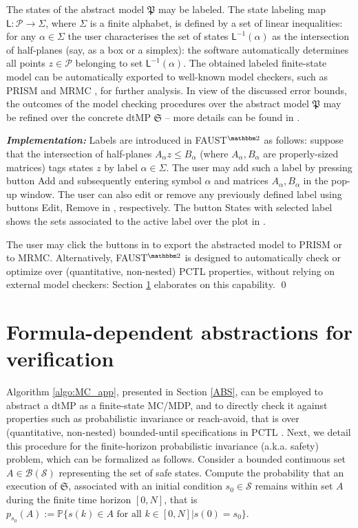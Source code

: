 \documentclass{llncs}
\newcommand*\circledb[1]{\tikz[baseline=(char.base)]{\node[shape=circle,draw,inner sep=0.2pt] (char) {#1};}}
\newcommand{\software}{\textsf{FAUST}$^{\mathbbm 2}$\xspace}
\newcommand{\boxname}[1]{\textsf{#1}}
\begin{document}
The states of the abstract model $\mathfrak P$ may be labeled. 
The state labeling map $\mathsf L:\mathcal P\rightarrow \Sigma$, 
where $\Sigma$ is a finite alphabet, 
is defined by a set of linear inequalities:  
for any $\alpha\in\Sigma$ the user characterises the set of states $\mathsf L^{-1}(\alpha)$ as the intersection of half-planes (say, as a box or a simplex):  
the software automatically determines all points $z\in\mathcal P$ belonging to set $\mathsf L^{-1}(\alpha)$.   
The obtained labeled finite-state model
can be automatically exported to well-known model checkers, 
such as PRISM and MRMC \cite{HKNP06,KKZ05}, 
for further analysis.   
In view of the discussed error bounds, 
the outcomes of the model checking procedures over the abstract model $\mathfrak P$ may be refined over the concrete dtMP $\mathfrak S$ -- 
more details can be found in \cite{APKL10,TA13}. 

\textit{\textbf{Implementation: }}
Labels are introduced in \software as follows: 
suppose that the intersection of half-planes $A_{\alpha}z\le B_{\alpha}$ (where $A_{\alpha},B_{\alpha}$ are properly-sized matrices) tags states $z$ by label $\alpha\in\Sigma$. 
The user may add such a label
by pressing button \boxname{Add} \circledb{10} and subsequently entering symbol $\alpha$ and matrices $A_{\alpha},B_{\alpha}$ in the pop-up window.
The user can also edit or remove any previously defined label using buttons \boxname{Edit, Remove} in \circledb{10}, respectively. 
The button \boxname{States with selected label} \circledb{10} shows the sets associated to the active label over the plot in \circledb{13} . 

The user may click the buttons in \circledb{11} to export the abstracted model to PRISM or to MRMC. 
Alternatively, \software is designed to automatically check or optimize over (quantitative, non-nested) PCTL properties, 
without relying on external model checkers: Section \ref{PCTL} elaborates on this capability. 
\qed

\vspace{-0.1in}
\section{Formula-dependent abstractions for verification}
\label{PCTL}

Algorithm \ref{algo:MC_app}, presented in Section \ref{ABS}, 
can be employed to abstract a dtMP as a finite-state MC/MDP, 
and to directly check it against properties such as probabilistic invariance or reach-avoid, 
that is over (quantitative, non-nested) bounded-until specifications in PCTL \cite{HJ94}. 
Next, we detail this procedure for the finite-horizon probabilistic invariance (a.k.a. safety) problem, 
which can be formalized as follows. 
Consider a bounded continuous set $A \in \mathcal B(\mathcal S)$ representing the set of safe states.
Compute the probability that an execution of $\mathfrak S$, 
associated with an initial condition $s_{0} \in \mathcal S$ 
remains within set $A$ during the finite time horizon $[0,N]$, that is
$p_{s_0}(A) := \mathbb P\{ s(k)\in A \text{ for all } k\in [0,N]| s(0) = s_{0} \}$.
\end{document}
